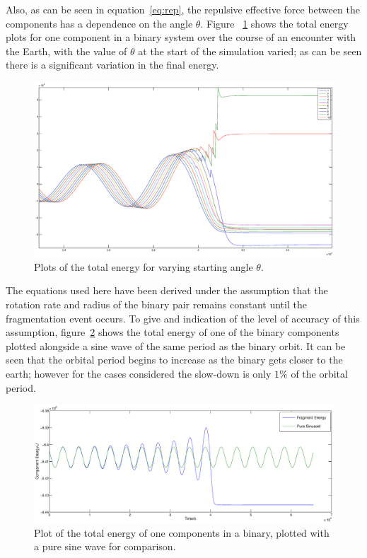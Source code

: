 \documentclass[letterpaper, preprint, paper,11pt]{AAS}	%
\begin{document}
Also, as can be seen in equation~\ref{eq:rep}, the repulsive effective force between the components has a dependence on the angle $\theta$. Figure ~\ref{fig:phase} shows the total energy plots for one component in a binary system over the course of an encounter with the Earth, with the value of $\theta$ at the start of the simulation varied; as can be seen there is a significant variation in the final energy. 
 \begin{figure}[H]
\centering
\centerline{\includegraphics[width=1.2\textwidth]{phasing_2.eps}} 
\caption{Plots of the total energy for varying starting angle $\theta$.} 
\label{fig:phase}
\end{figure} 

The equations used here have been derived under the assumption that the rotation rate and radius of the binary pair remains constant until the fragmentation event occurs. To give and indication of the level of accuracy of this assumption, figure~\ref{fig:sin} shows the total energy of one of the binary components plotted alongside a sine wave of the same period as the binary orbit. It can be seen that the orbital period begins to increase as the binary gets closer to the earth; however for the cases considered the slow-down is only $1\%$ of the orbital period. 
\begin{center}
\begin{figure}[H]
\centering
\centerline{\includegraphics[width=1.2\textwidth]{pure_sin.eps}} 
\caption{Plot of the total energy of one components in a binary, plotted with a pure sine wave for comparison.} 
\label{fig:sin}
\end{figure}
\end{center}
\end{document}
